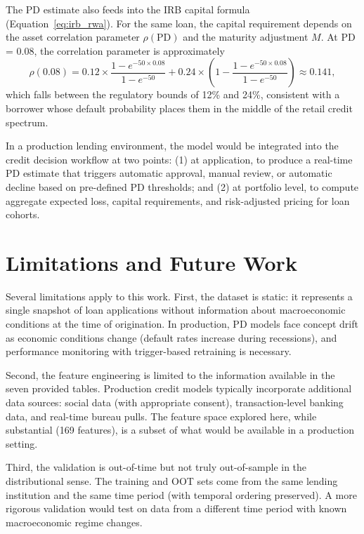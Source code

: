 \documentclass[11pt, a4paper]{article}
\newcommand{\PD}{\text{PD}}
\begin{document}
The PD estimate also feeds into the IRB capital formula (Equation~\ref{eq:irb_rwa}). For the same loan, the capital requirement depends on the asset correlation parameter $\rho(\PD)$ and the maturity adjustment $M$. At PD = 0.08, the correlation parameter is approximately
\[
\rho(0.08) = 0.12 \times \frac{1 - e^{-50 \times 0.08}}{1 - e^{-50}} + 0.24 \times \left(1 - \frac{1 - e^{-50 \times 0.08}}{1 - e^{-50}}\right) \approx 0.141,
\]
which falls between the regulatory bounds of 12\% and 24\%, consistent with a borrower whose default probability places them in the middle of the retail credit spectrum.

In a production lending environment, the model would be integrated into the credit decision workflow at two points: (1) at application, to produce a real-time PD estimate that triggers automatic approval, manual review, or automatic decline based on pre-defined PD thresholds; and (2) at portfolio level, to compute aggregate expected loss, capital requirements, and risk-adjusted pricing for loan cohorts.

\section{Limitations and Future Work}
\label{sec:limitations}

Several limitations apply to this work. First, the dataset is static: it represents a single snapshot of loan applications without information about macroeconomic conditions at the time of origination. In production, PD models face concept drift as economic conditions change (default rates increase during recessions), and performance monitoring with trigger-based retraining is necessary.

Second, the feature engineering is limited to the information available in the seven provided tables. Production credit models typically incorporate additional data sources: social data (with appropriate consent), transaction-level banking data, and real-time bureau pulls. The feature space explored here, while substantial (169 features), is a subset of what would be available in a production setting.

Third, the validation is out-of-time but not truly out-of-sample in the distributional sense. The training and OOT sets come from the same lending institution and the same time period (with temporal ordering preserved). A more rigorous validation would test on data from a different time period with known macroeconomic regime changes.
\end{document}
